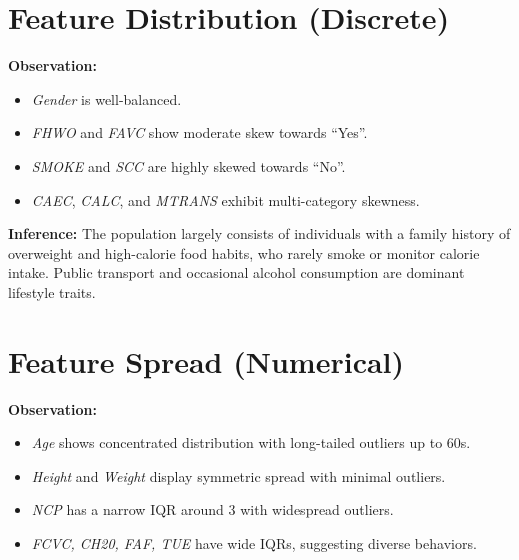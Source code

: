 

\section{Feature Distribution (Discrete)}\label{sec:feature-distribution-(discrete)}

\textbf{Observation:}
\begin{itemize}
    \item \textit{Gender} is well-balanced.
    \item \textit{FHWO} and \textit{FAVC} show moderate skew towards “Yes”.
    \item \textit{SMOKE} and \textit{SCC} are highly skewed towards “No”.
    \item \textit{CAEC}, \textit{CALC}, and \textit{MTRANS} exhibit multi-category skewness.
\end{itemize}

\textbf{Inference:}
The population largely consists of individuals with a family history of overweight and high-calorie food habits, who rarely smoke or monitor calorie intake.
Public transport and occasional alcohol consumption are dominant lifestyle traits.



\section{Feature Spread (Numerical)}\label{sec:feature-spread-(numerical)}

\textbf{Observation:}
\begin{itemize}
    \item \textit{Age} shows concentrated distribution with long-tailed outliers up to 60s.
    \item \textit{Height} and \textit{Weight} display symmetric spread with minimal outliers.
    \item \textit{NCP} has a narrow IQR around 3 with widespread outliers.
    \item \textit{FCVC, CH20, FAF, TUE} have wide IQRs, suggesting diverse behaviors.
\end{itemize}

